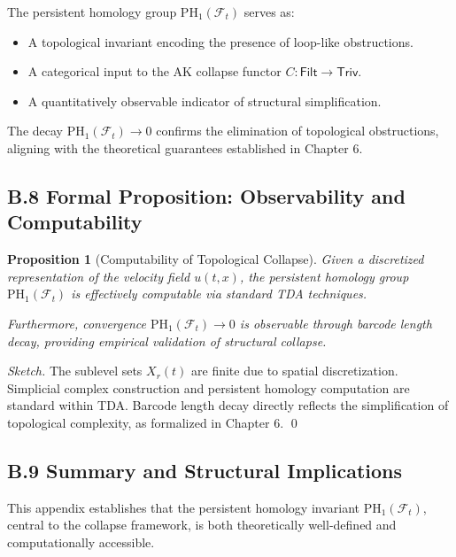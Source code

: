 \documentclass[11pt]{article}
\newtheorem{proposition}[theorem]{Proposition}
\begin{document}
The persistent homology group \( \mathrm{PH}_1(\mathcal{F}_t) \) serves as:

\begin{itemize}
  \item A topological invariant encoding the presence of loop-like obstructions.
  \item A categorical input to the AK collapse functor \( C: \mathsf{Filt} \to \mathsf{Triv} \).
  \item A quantitatively observable indicator of structural simplification.
\end{itemize}

The decay \( \mathrm{PH}_1(\mathcal{F}_t) \to 0 \) confirms the elimination of topological obstructions, aligning with the theoretical guarantees established in Chapter 6.

\subsection*{B.8 Formal Proposition: Observability and Computability}

\begin{proposition}[Computability of Topological Collapse]
Given a discretized representation of the velocity field \( u(t,x) \), the persistent homology group \( \mathrm{PH}_1(\mathcal{F}_t) \) is effectively computable via standard TDA techniques.

Furthermore, convergence \( \mathrm{PH}_1(\mathcal{F}_t) \to 0 \) is observable through barcode length decay, providing empirical validation of structural collapse.
\end{proposition}

\begin{proof}[Sketch]
The sublevel sets \( X_r(t) \) are finite due to spatial discretization. Simplicial complex construction and persistent homology computation are standard within TDA. Barcode length decay directly reflects the simplification of topological complexity, as formalized in Chapter 6.
\hfill \qed
\end{proof}

\subsection*{B.9 Summary and Structural Implications}

This appendix establishes that the persistent homology invariant \( \mathrm{PH}_1(\mathcal{F}_t) \), central to the collapse framework, is both theoretically well-defined and computationally accessible.
\end{document}
